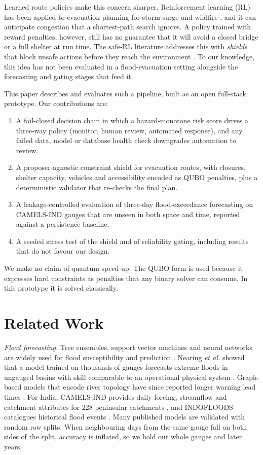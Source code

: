 \documentclass[conference]{IEEEtran}
\begin{document}
Learned route policies make this concern sharper. Reinforcement learning (RL) has been applied to evacuation planning for storm surge \cite{LiuC2025} and wildfire \cite{Raei2026}, and it can anticipate congestion that a shortest-path search ignores. A policy trained with reward penalties, however, still has no guarantee that it will avoid a closed bridge or a full shelter at run time. The safe-RL literature addresses this with \emph{shields} that block unsafe actions before they reach the environment \cite{Alshiekh2018,Garcia2015}. To our knowledge, this idea has not been evaluated in a flood-evacuation setting alongside the forecasting and gating stages that feed it.

This paper describes and evaluates such a pipeline, built as an open full-stack prototype. Our contributions are:
\begin{enumerate}
\item A fail-closed decision chain in which a hazard-monotone risk score drives a three-way policy (monitor, human review, automated response), and any failed data, model or database health check downgrades automation to review.
\item A proposer-agnostic constraint shield for evacuation routes, with closures, shelter capacity, vehicles and accessibility encoded as QUBO penalties, plus a deterministic validator that re-checks the final plan.
\item A leakage-controlled evaluation of three-day flood-exceedance forecasting on CAMELS-IND gauges that are unseen in both space and time, reported against a persistence baseline.
\item A seeded stress test of the shield and of reliability gating, including results that do not favour our design.
\end{enumerate}
We make no claim of quantum speed-up. The QUBO form is used because it expresses hard constraints as penalties that any binary solver can consume. In this prototype it is solved classically.

\section{Related Work}
\textit{Flood forecasting.} Tree ensembles, support vector machines and neural networks are widely used for flood susceptibility and prediction \cite{Mosavi2018}. Nearing \textit{et al.} showed that a model trained on thousands of gauges forecasts extreme floods in ungauged basins with skill comparable to an operational physical system \cite{Nearing2024}. Graph-based models that encode river topology have since reported longer warning lead times \cite{Kirschstein2024}. For India, CAMELS-IND provides daily forcing, streamflow and catchment attributes for 228 peninsular catchments \cite{Mangukiya2025}, and INDOFLOODS catalogues historical flood events \cite{Kuntla2025}. Many published models are validated with random row splits. When neighbouring days from the same gauge fall on both sides of the split, accuracy is inflated, so we hold out whole gauges and later years.
\end{document}

